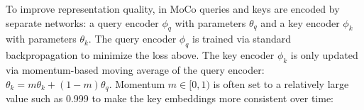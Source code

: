 To improve representation quality, in MoCo queries and keys are encoded by separate networks: a query encoder $\phi_q$ with parameters $\theta_q$ and a key encoder $\phi_k$ with parameters $\theta_k$. 
The query encoder $\phi_q$ is trained via standard backpropagation to minimize the loss above. The key encoder $\phi_k$ is only updated via momentum-based moving average of the query encoder: $\theta_k = m \theta_k + (1 - m)\theta_q$.
Momentum $m \in [0, 1)$ is often set to a relatively large value such as 0.999 to make the key embeddings more consistent over time: 









